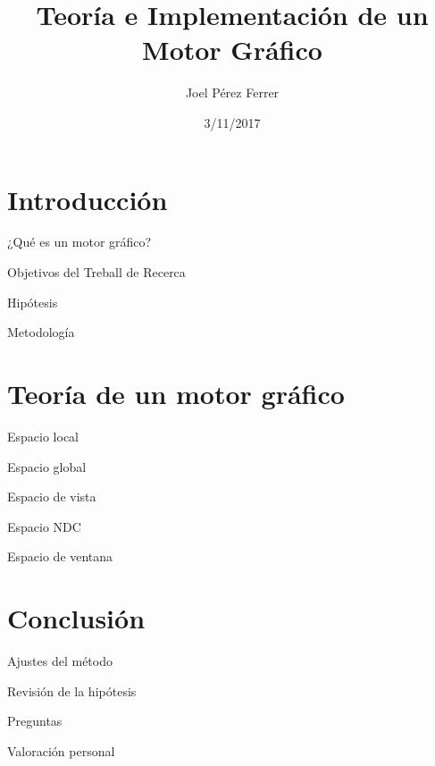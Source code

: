 \documentclass{beamer}
\title[T. e I. de un Motor Gráfico]{Teoría e Implementación de un Motor Gráfico}
\author{Joel Pérez Ferrer}
\institute{Institut de Bruguers}
\date{3/11/2017}
\begin{document}
\begin{frame}
  \titlepage
\end{frame}

\section{Introducción}
\begin{frame}{¿Qué es un motor gráfico?}
\end{frame}
\begin{frame}{Objetivos del Treball de Recerca}
\end{frame}
\begin{frame}{Hipótesis}
\end{frame}
\begin{frame}{Metodología}
\end{frame}


\section{Teoría de un motor gráfico}
\begin{frame}{Espacio local}
\end{frame}
\begin{frame}{Espacio global}
\end{frame}
\begin{frame}{Espacio de vista}
\end{frame}
\begin{frame}{Espacio NDC}
\end{frame}
\begin{frame}{Espacio de ventana}
\end{frame}

\section{Conclusión}
\begin{frame}{Ajustes del método}
\end{frame}
\begin{frame}{Revisión de la hipótesis}
\end{frame}
\begin{frame}{Preguntas}
\end{frame}
\begin{frame}{Valoración personal}
\end{frame}
\end{document}
